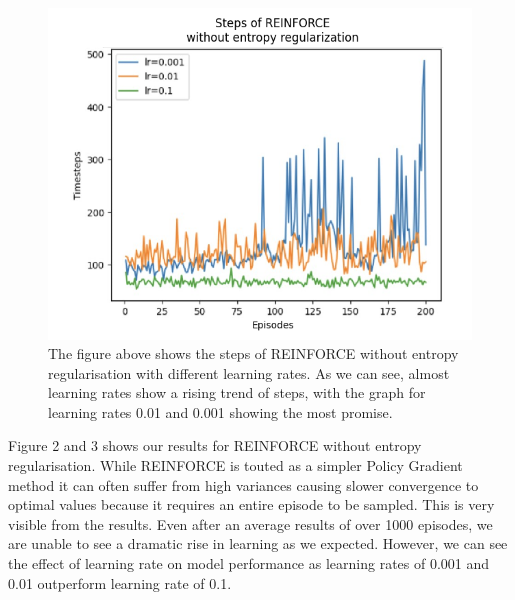 \documentclass{article}
\begin{document}
\begin{figure}[h!]
\centering
\includegraphics[width=0.9\linewidth]{Report/images/03.Steps_of_REINFORCE_without_ER.png}
\caption{\label{fig:ReinforceEntropy_Rewards}The figure above shows the steps of REINFORCE without entropy regularisation with different learning rates. As we can see, almost learning rates show a rising trend of steps, with the graph for learning rates 0.01 and 0.001 showing the most promise. }
\end{figure}
\par Figure 2 and 3 shows our results for REINFORCE without entropy regularisation. While REINFORCE is touted as a simpler Policy Gradient method it can often suffer from high variances causing slower convergence to optimal values because it requires an entire episode to be sampled. This is very visible from the results. Even after an average results of over 1000 episodes, we are unable to see a dramatic rise in learning as we expected. However, we can see the effect of learning rate on model performance as learning rates of 0.001 and 0.01 outperform learning rate of 0.1. 
\end{document}

